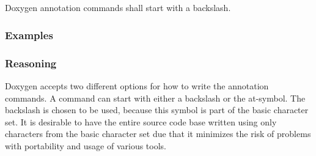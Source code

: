 \subsection*{\doxygenRule{}}

Doxygen annotation commands shall start with a backslash.

\subsubsection*{Examples}

\noindent
\begin{minipage}[t]{0.47\textwidth}
    
\end{minipage}\hfill
\begin{minipage}[t]{0.47\textwidth}
    
\end{minipage}


\subsubsection*{Reasoning}

Doxygen accepts two different options for how to write the annotation commands. A command can start with either a backslash or the at-symbol.
The backslash is chosen to be used, because this symbol is part of the basic character set. It is desirable to have the entire source code base written using only characters from the basic character set due that it minimizes the risk of problems with portability and usage of various tools.
